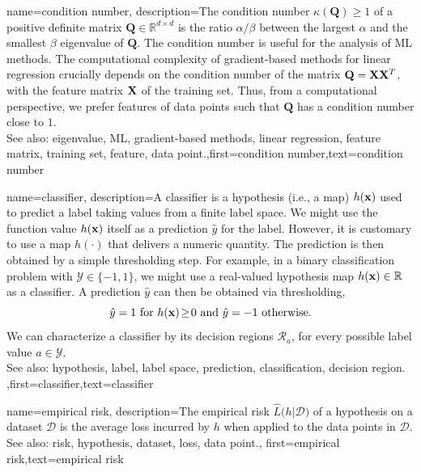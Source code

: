 {
	name={condition number},
	description={The condition number $\kappa(\mathbf{Q}) \geq 1$ of a 
		positive definite 
		matrix $\mathbf{Q} \in \mathbb{R}^{d \times d}$ is the ratio 
		$\alpha /\beta  $ between the 
		largest $\alpha$ and the smallest $\beta$ eigenvalue of 
		$\mathbf{Q}$. The condition number is useful for the analysis of ML methods. 
		The computational complexity of gradient-based methods for linear regression crucially depends on the 
		condition number of the matrix $\mathbf{Q} = {\bf X} {\bf X}^{T}$, with the feature matrix ${\bf X}$ 
		of the training set. Thus, from a computational perspective, we prefer features of 
		data points such that $\mathbf{Q}$ has a condition number close to $1$.
					\\ 
		See also: eigenvalue, ML, gradient-based methods, linear regression, feature matrix, training set, feature, data point.},first={condition number},text={condition number} 
}

{
	name={classifier},
	description={A classifier is a hypothesis (i.e., a map) $h({\bf x})$ 
		used to predict a label taking values from a finite label space. We might use the 
		function value $h({\bf x})$ itself as a prediction $\hat{y}$ for 
		the label. However, it is customary to use a map $h(\cdot)$ that delivers 
		a numeric quantity. The prediction is then obtained by a simple thresholding step. 
		For example, in a binary classification problem with \label{labelspace} $\mathcal{Y} \in  \{ -1,1\}$, 
		we might use a real-valued hypothesis map $h({\bf x}) \in \mathbb{R}$ 
		as a classifier. A prediction $\hat{y}$ can then be obtained via thresholding,  
		 \begin{equation} 
		 	\label{equ_def_threshold_bin_classifier_dict}
		 	\hat{y} =1   \mbox{ for } h({\bf x})\!\geq\!0 \mbox{ and } 	\hat{y} =-1  \mbox{ otherwise.}
	 		\end{equation}
 		We can characterize a classifier by its decision regions $\mathcal{R}_{a}$, for 
 		every possible label value $a \in \mathcal{Y}$.
					\\ 
		See also: hypothesis, label, label space, prediction, classification, decision region. },first={classifier},text={classifier} 
}

{name={empirical risk},
  description={The empirical risk $\widehat{L}\big(h|\mathcal{D}\big)$ 
  	of a hypothesis on a dataset $\mathcal{D}$ is the average loss incurred 
  	by $h$ when applied to the data points in $\mathcal{D}$.
				\\ 
		See also: risk, hypothesis, dataset, loss, data point.},
  first={empirical risk},text={empirical risk} 
}

